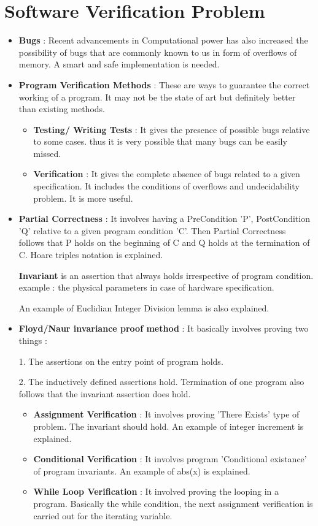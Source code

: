 \chapter{Software Verification Problem }

\begin{itemize}
	\item{\textbf{Bugs} : 
	Recent advancements in Computational power has also increased the possibility of bugs that are commonly known to us in form of overflows of memory. A smart and safe implementation is needed. 
	}

	\item{\textbf{Program Verification Methods} : 
	These are ways to guarantee the correct working of a program. It may not be the state of art but definitely better than existing methods.
	\begin{itemize}
		\item {\textbf{ Testing/ Writing Tests} :
		It gives the presence of possible bugs relative to some cases. thus it is very possible that many bugs can be easily missed. 
		}
		\item {\textbf{ Verification} : It gives the complete absence of bugs related to a given specification. It includes the conditions of overflows and undecidability problem. It is more useful.
		}
	\end{itemize}
	}

	\item{\textbf{Partial Correctness} :
	It involves having a PreCondition 'P', PostCondition 'Q' relative to a given program condition 'C'. Then Partial Correctness follows that P holds on the beginning of C and Q holds at the termination of C. Hoare triples notation is explained. 

	\textbf{Invariant} is an assertion that always holds irrespective of program condition. example : the physical parameters in case of hardware specification.

	An example of Euclidian Integer Division lemma is also explained.
	}

	\item{\textbf{Floyd/Naur invariance proof method} :
	It basically involves proving two things :

	1. The assertions on the entry point of program holds.

	2. The inductively defined assertions hold. Termination of one program also follows that the invariant assertion does hold.

	\begin{itemize}
		\item{\textbf{Assignment Verification} : It involves proving 'There Exists' type of problem. The invariant should hold. An example of integer increment is explained.}
		\item{\textbf{Conditional Verification} : It involves program 'Conditional existance' of program invariants. An example of abs(x) is explained.}
		\item{\textbf{While Loop Verification} : It involved proving the looping in a program. Basically the while condition, the next assignment verification is carried out for the iterating variable.}
	\end{itemize}
	}


\end{itemize}
